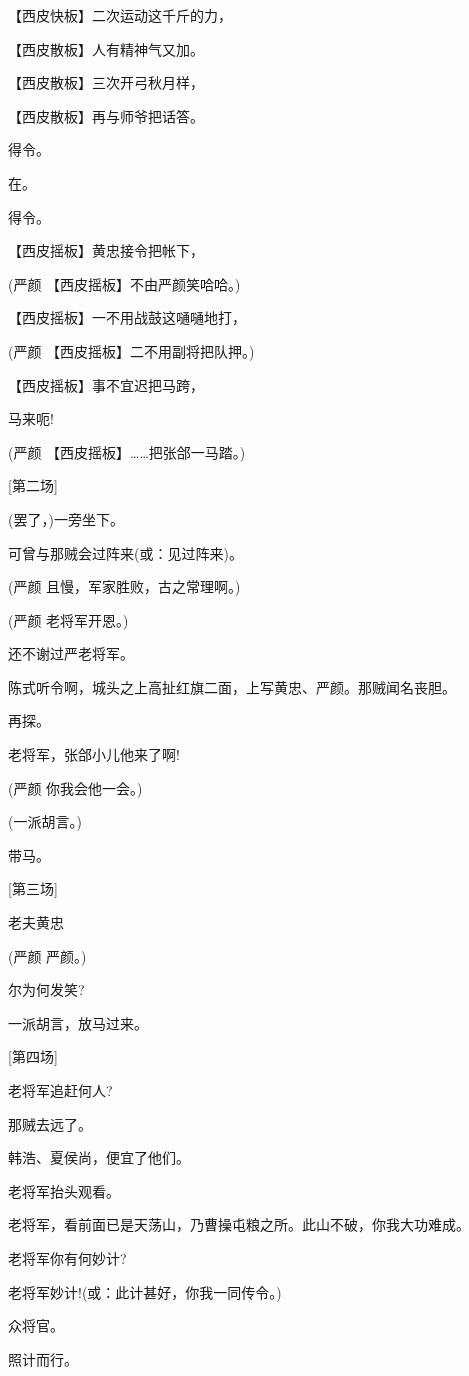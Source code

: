 【西皮快板】二次运动这千斤的力，

【西皮散板】人有精神气又加。

【西皮散板】三次开弓秋月样，

【西皮散板】再与师爷把话答。

得令。

在。

得令。

【西皮摇板】黄忠接令把帐下，

(严颜 【西皮摇板】不由严颜笑哈哈。)

【西皮摇板】一不用战鼓这嗵嗵地打，

(严颜 【西皮摇板】二不用副将把队押。)

【西皮摇板】事不宜迟把马跨，

马来呃!

(严颜 【西皮摇板】\ldots{}\ldots{}把张郃一马踏。)

{[}第二场{]}

(罢了，)一旁坐下。

可曾与那贼会过阵来(或：见过阵来)。

(严颜 且慢，军家胜败，古之常理啊。)

(严颜 老将军开恩。)

还不谢过严老将军。

陈式听令啊，城头之上高扯红旗二面，上写黄忠、严颜。那贼闻名丧胆。

再探。

老将军，张郃小儿他来了啊!

(严颜 你我会他一会。)

(一派胡言。)

带马。

{[}第三场{]}

老夫黄忠

(严颜 严颜。)

尔为何发笑?

一派胡言，放马过来。

{[}第四场{]}

老将军追赶何人?

那贼去远了。

韩浩、夏侯尚，便宜了他们。

老将军抬头观看。

老将军，看前面已是天荡山，乃曹操屯粮之所。此山不破，你我大功难成。

老将军你有何妙计?

老将军妙计!(或：此计甚好，你我一同传令。)

众将官。

照计而行。

